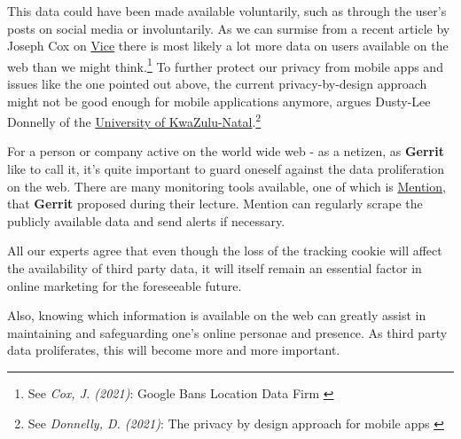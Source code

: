 This data could have been made available voluntarily, such as through the user's posts on social media or involuntarily. As we can surmise from a recent article by Joseph Cox on \href{https://www.vice.com/en}{Vice} there is most likely a lot more data on users available on the web than we might think.\footnote{See \textit{Cox, J. (2021)}: Google Bans Location Data Firm \cite{locationBan}} To further protect our privacy from mobile apps and issues like the one pointed out above, the current privacy-by-design approach might not be good enough for mobile applications anymore, argues Dusty-Lee Donnelly of the \href{https://ukzn.ac.za/}{University of KwaZulu-Natal}.\footnote{See \textit{Donnelly, D. (2021)}: The privacy by design approach for mobile apps \cite{privacyDesign}}

For a person or company active on the world wide web - as a netizen, as \textbf{Gerrit} like to call it, it's quite important to guard oneself against the data proliferation on the web. There are many monitoring tools available, one of which is \href{https://mention.com/en/}{Mention}, that \textbf{Gerrit} proposed during their lecture. Mention can regularly scrape the publicly available data and send alerts if necessary. 

All our experts agree that even though the loss of the tracking cookie will affect the availability of third party data, it will itself remain an essential factor in online marketing for the foreseeable future. 

Also, knowing which information is available on the web can greatly assist in maintaining and safeguarding one's online personae and presence. As third party data proliferates, this will become more and more important.
